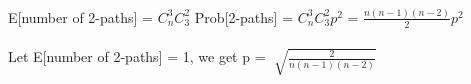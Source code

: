 \begin{problem}{1} ~\\
E[number of 2-paths] = $C_n^3 C_3^2$ Prob[2-paths] = $C_n^3 C_3^2 p^2$ = $\frac{n(n-1)(n-2)}{2} p^2$\\
\\
Let E[number of 2-paths] = 1, we get p = $\sqrt[]{\frac{2}{n(n-1)(n-2)}}$
\end{problem}